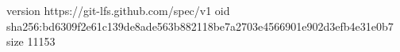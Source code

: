 version https://git-lfs.github.com/spec/v1
oid sha256:bd6309f2e61c139de8ade563b882118be7a2703e4566901e902d3efb4e31e0b7
size 11153

